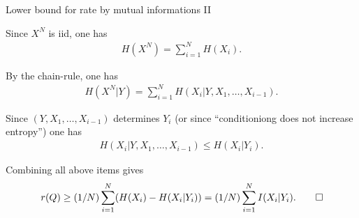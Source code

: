\begin{frame}{Lower bound for rate by mutual informations II}
\bit
\item Since $X^N$ is iid, one has
\begin{align*}
H(X^N)=\sum_{i=1}^NH(X_i).
\end{align*}
\item By the chain-rule, one has
\begin{align*}
H(X^N|Y)=\sum_{i=1}^NH(X_i|Y,X_1,\dots,X_{i-1}).
\end{align*}
\item Since $(Y,X_1,\dots,X_{i-1})$ determines $Y_i$ (or since ``conditioniong does not increase entropy'') one has
\begin{align*}
H(X_i|Y,X_1,\dots,X_{i-1})\leq H(X_i|Y_i).  
\end{align*}
\item Combining all above items gives
\begin{align*}
r(Q)\geq (1/N) \sum_{i=1}^N(H(X_i)-H(X_i|Y_i))=(1/N) \sum_{i=1}^NI(X_i|Y_i). \qed
\end{align*}
\eit 
\end{frame}


